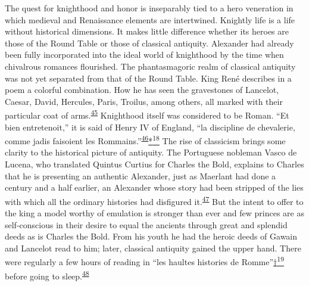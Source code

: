 The quest for knighthood and honor is inseparably tied to a hero
veneration in which medieval and Renaissance elements are intertwined.
Knightly life is a life without historical dimensions. It makes little
difference whether its heroes are those of the Round Table or those of
classical antiquity. Alexander had already been fully incorporated into
the ideal world of knighthood by the time when chivalrous romances
flourished. The phantasmagoric realm of classical antiquity was not yet
separated from that of the Round Table. King René describes in a poem a
colorful combination. How he has seen the gravestones of Lancelot,
Caesar, David, Hercules, Paris, Troilus, among others, all marked with
their particular coat of
arms.\textsuperscript{\protect\hypertarget{10_Chapter_Three__THE_HEROIC_DREAM.xhtmlux5cux23id_1843}{\protect\hyperlink{23_NOTES.xhtmlux5cux23id_1844}{45}}}
Knighthood itself was considered to be Roman. ``Et bien entretenoit,''
it is said of Henry IV of England, ``la discipline de chevalerie, comme
jadis faisoient les
Rommains.''\textsuperscript{\protect\hypertarget{10_Chapter_Three__THE_HEROIC_DREAM.xhtmlux5cux23id_1841}{\protect\hyperlink{23_NOTES.xhtmlux5cux23id_1842}{46}}}\protect\hypertarget{10_Chapter_Three__THE_HEROIC_DREAM.xhtmlux5cux23id_2497}{\protect\hyperlink{23_NOTES.xhtmlux5cux23id_2498}{*\textsuperscript{18}}}
The rise of classicism brings some clarity to the historical picture of
antiquity. The Portuguese nobleman Vasco de Lucena, who translated
Quintus Curtius for Charles the Bold, explains to Charles that he is
presenting an authentic Alexander, just as Maerlant had done a century
and a half earlier, an Alexander whose story had been stripped of the
lies with which all the ordinary histories had disfigured
it.\textsuperscript{\protect\hypertarget{10_Chapter_Three__THE_HEROIC_DREAM.xhtmlux5cux23id_1839}{\protect\hyperlink{23_NOTES.xhtmlux5cux23id_1840}{47}}}
But the intent to offer to the king a model worthy of emulation is
stronger than ever and few princes are as self-conscious in their desire
to equal the ancients through great and splendid deeds as is Charles the
Bold. From his youth he had the heroic deeds of Gawain and Lancelot read
to him; later, classical antiquity gained the upper hand. There were
regularly a few hours of reading in ``les haultes histories de
Romme''\protect\hypertarget{10_Chapter_Three__THE_HEROIC_DREAM.xhtmlux5cux23id_2501}{\protect\hyperlink{23_NOTES.xhtmlux5cux23id_2502}{†\textsuperscript{19}}}
before going to
sleep.\textsuperscript{\protect\hypertarget{10_Chapter_Three__THE_HEROIC_DREAM.xhtmlux5cux23id_1837}{\protect\hyperlink{23_NOTES.xhtmlux5cux23id_1838}{48}}}
